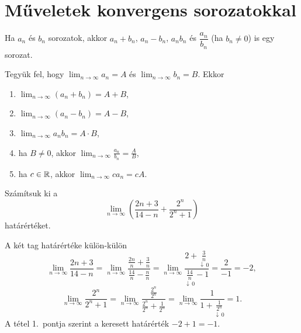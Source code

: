 \documentclass[11pt]{article}
\begin{document}
\section{Műveletek konvergens sorozatokkal}

Ha $a_{n}$ és $b_{n}$ sorozatok, akkor $a_{n}+b_{n}$, $a_{n}-b_{n}$, $a_{n}b_{n}$ és $\dfrac{a_{n}}{b_{n}}$ (ha $b_{n}\neq 0$) is egy sorozat.

\begin{thmbox}
\begin{theorem}
Tegyük fel, hogy $\displaystyle\lim_{n\to\infty}a_{n}=A$ és $\displaystyle\lim_{n\to\infty}b_{n}=B$. Ekkor
\begin{enumerate}[label=\arabic*.]
\item $\displaystyle\lim_{n\to\infty}(a_{n}+b_{n})=A+B$,
\item $\displaystyle\lim_{n\to\infty}(a_{n}-b_{n})=A-B$,
\item $\displaystyle\lim_{n\to\infty}a_{n}b_{n}=A\cdot B$,
\item ha $B\neq 0$, akkor $\displaystyle\lim_{n\to\infty}\frac{a_{n}}{b_{n}}=\frac{A}{B}$,
\item ha $c\in\mathbb{R}$, akkor $\displaystyle\lim_{n\to\infty}ca_{n}=cA$.
\end{enumerate}
\end{theorem}
\end{thmbox}

\begin{exbox}
\begin{example}
Számítsuk ki a
\[
\lim_{n\to\infty}\left(\frac{2n+3}{14-n}+\frac{2^{n}}{2^{n}+1}\right)
\]
határértéket.
\end{example}
\end{exbox}
\begin{solution}
A két tag határértéke külön-külön
\[
\lim_{n\to\infty}\frac{2n+3}{14-n}
=\lim_{n\to\infty}\frac{\frac{2n}{n}+\frac{3}{n}}{\frac{14}{n}-\frac{n}{n}}
=\lim_{n\to\infty}\frac{2+\underset{\downarrow\,0}{\frac{3}{n}}}
{\underset{\downarrow\,0}{\frac{14}{n}}-1}=\frac{2}{-1}=-2,
\]
\[
\lim_{n\to\infty}\frac{2^{n}}{2^{n}+1}
=\lim_{n\to\infty}\frac{\frac{2^{n}}{2^{n}}}{\frac{2^{n}}{2^{n}}+\frac{1}{2^{n}}}
=\lim_{n\to\infty}\frac{1}{1+\underset{\downarrow\,0}{\frac{1}{2^{n}}}}=1 .
\]
A tétel 1.\ pontja szerint a keresett határérték $-2+1=-1$.
\end{solution}

\end{document}
